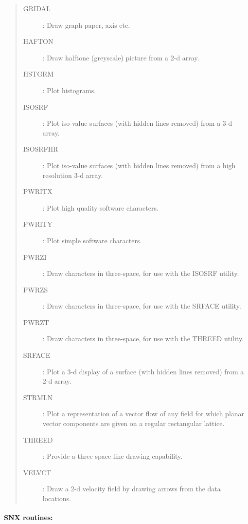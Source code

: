 \begin{quote}
\begin{description}
\item [GRIDAL] : 
 Draw graph paper, axis etc.
\item [HAFTON] : 
 Draw halftone (greyscale) picture from a 2-d array.
\item [HSTGRM] : 
 Plot histograms.
\item [ISOSRF] : 
 Plot iso-value surfaces (with hidden lines removed) from a 3-d array.
\item [ISOSRFHR] : 
 Plot iso-value surfaces (with hidden lines removed) from a high resolution
 3-d array.
\item [PWRITX] : 
 Plot high quality software characters.                      
\item [PWRITY] : 
 Plot simple software characters.
\item [PWRZI] : 
 Draw characters in three-space, for use with the ISOSRF utility.
\item [PWRZS] : 
 Draw characters in three-space, for use with the SRFACE utility.
\item [PWRZT] : 
 Draw characters in three-space, for use with the THREED utility.
\item [SRFACE] : 
 Plot a 3-d display of a surface (with hidden lines removed) from a 2-d array.
\item [STRMLN] : 
 Plot a representation of a vector flow of any field for which planar vector
 components are given on a regular rectangular lattice.
\item [THREED] : 
 Provide a three space line drawing capability.
\item [VELVCT] : 
 Draw a 2-d velocity field by drawing arrows from the data
 locations.
\end{description}
\end{quote}

\newpage

\paragraph{SNX routines:}

